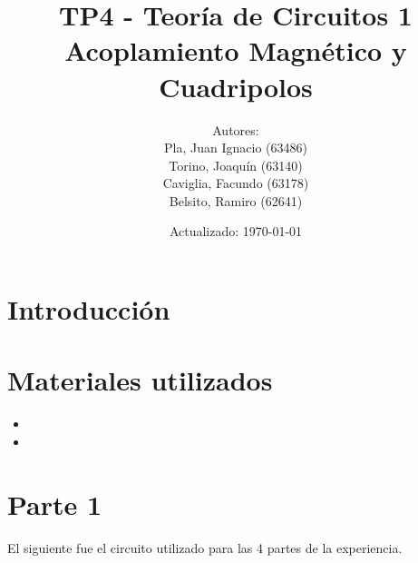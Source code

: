 \documentclass[a4paper,12pt]{article}
\title{TP4 - Teoría de Circuitos 1\\ Acoplamiento Magnético y Cuadripolos}
\author{Autores: \\Pla, Juan Ignacio (63486)\\Torino, Joaquín (63140)\\Caviglia, Facundo (63178)\\Belsito, Ramiro (62641)}
\date{Actualizado: \today}
\begin{document}
\maketitle

\section{Introducción}
\hspace{1cm}

\hspace{1cm}

\hspace{1cm}
\hspace{1cm}

\section{Materiales utilizados}

\begin{itemize}
\item
\item 
\end{itemize}

\section{Parte 1}

\hspace{1cm} El siguiente fue el circuito utilizado para las 4 partes de la experiencia.
\end{document}
